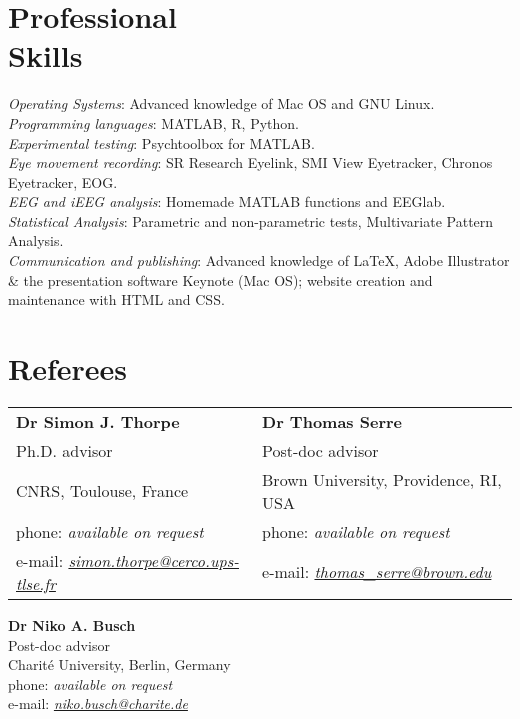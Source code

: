 \documentclass[margin,line]{resume}
\begin{document}
\begin{resume}
    \section{\mysidestyle Professional\\Skills}
	\textsl{Operating Systems}: Advanced knowledge of Mac OS and GNU Linux.\\
	\textsl{Programming languages}: MATLAB, R, Python.\\
	\textsl{Experimental testing}: Psychtoolbox for MATLAB.\\
	\textsl{Eye movement recording}: SR Research Eyelink, SMI View Eyetracker, Chronos Eyetracker, EOG.\\
	\textsl{EEG and iEEG analysis}: Homemade MATLAB functions and EEGlab.\\
	\textsl{Statistical Analysis}: Parametric and non-parametric tests, Multivariate Pattern Analysis.\\
	\textsl{Communication and publishing}: Advanced knowledge of \LaTeX, Adobe Illustrator \& the presentation software Keynote (Mac OS); website creation and maintenance with HTML and CSS.


	\section{\mysidestyle Referees} 

	\begin{tabular}{@{}p{6cm}p{6cm}}
	\textbf{Dr Simon J. Thorpe}       &  \textbf{Dr Thomas Serre}                   \\
	Ph.D. advisor                               &  Post-doc advisor                       \\
	CNRS, Toulouse, France          &  Brown University, Providence, RI, USA        \\
	phone: \textsl{available on request}    &  phone: \textsl{available on request}     \\
	e-mail: \textsl{\href{mailto:simon.thorpe@cerco.ups-tlse.fr}{simon.thorpe@cerco.ups-tlse.fr}}   &  
	e-mail: \textsl{\href{mailto:thomas_serre@brown.edu}{thomas\_serre@brown.edu}}    \\
	\end{tabular}
	
	\textbf{Dr Niko A. Busch} \\
	Post-doc advisor\\
	Charité University, Berlin, Germany \\
	phone: \textsl{available on request} \\
	e-mail: \textsl{\href{mailto:niko.busch@charite.de}{niko.busch@charite.de}} \\

\end{resume}
\end{document}
